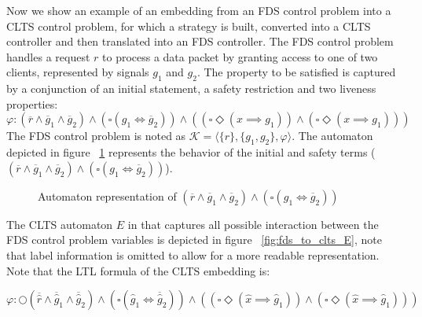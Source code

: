 Now we show an example of an embedding from an FDS control problem into a CLTS control problem, for which a strategy is built, converted into a CLTS controller and then translated into an FDS controller. 
The FDS control problem handles a request $r$ to process a data packet by granting access to one of two clients, represented by signals $g_1$ and $g_2$.
The property to be satisfied is captured by a conjunction of an initial statement, a safety restriction and two liveness properties:
\[\varphi: (\overline{r}\wedge \overline{g}_1\wedge \overline{g}_2)\wedge (\square(g_1 \iff \overline{g}_2))\wedge ((\square\Diamond(x \implies g_1))\wedge(\square\Diamond(x \implies g_1)))\]
The FDS control problem is noted as $\mathcal{K}=\langle \{r\}, \{g_1,g_2\}, \varphi \rangle$. The automaton depicted in figure ~\ref{fig:fds_to_clts_K} represents the behavior of the initial and safety terms ($(\overline{r}\wedge \overline{g}_1\wedge \overline{g}_2)\wedge (\square(g_1 \iff \overline{g}_2))$).

\begin{figure}[bt]
	\centering
	\caption{Automaton representation of $(\overline{r}\wedge \overline{g}_1\wedge \overline{g}_2)\wedge (\square(g_1 \iff \overline{g}_2))$}
	\label{fig:fds_to_clts_K}
\end{figure}

The CLTS automaton $E$ in \cltsCPEmbedding that captures all possible interaction between the FDS control problem variables is depicted in figure ~\ref{fig:fds_to_clts_E}, note that label information is omitted to allow for a more readable representation. Note that the LTL formula of the CLTS embedding is:

\[\varphi: \bigcirc(\overline{\hat{r}}\wedge \overline{\hat{g}}_1\wedge \overline{\hat{g}}_2)\wedge (\square(\hat{g}_1 \iff \overline{\hat{g}}_2))\wedge ((\square\Diamond(\hat{x} \implies \hat{g}_1))\wedge(\square\Diamond(\hat{x} \implies \hat{g}_1)))\]

